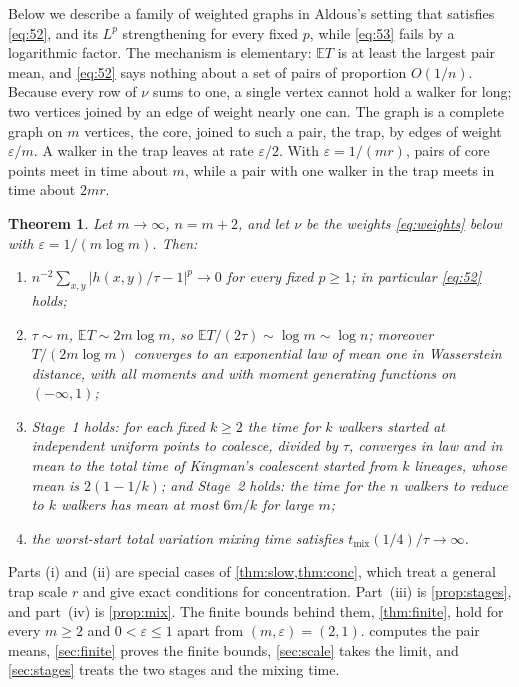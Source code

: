 \documentclass[11pt,a4paper]{article}
\numberwithin{equation}{section}
\newtheorem{theorem}{Theorem}[section]
\theoremstyle{remark}
\newcommand{\E}{\mathbb E}
\newcommand{\eps}{\varepsilon}
\newcommand{\abs}[1]{\lvert#1\rvert}
\begin{document}
Below we describe a family of weighted graphs in Aldous's setting that satisfies \eqref{eq:52}, and its $L^p$ strengthening for every fixed $p$, while \eqref{eq:53} fails by a logarithmic factor. The mechanism is elementary: $\E T$ is at least the largest pair mean, and \eqref{eq:52} says nothing about a set of pairs of proportion $O(1/n)$. Because every row of $\nu$ sums to one, a single vertex cannot hold a walker for long; two vertices joined by an edge of weight nearly one can. The graph is a complete graph on $m$ vertices, the core, joined to such a pair, the trap, by edges of weight $\eps/m$. A walker in the trap leaves at rate $\eps/2$. With $\eps=1/(mr)$, pairs of core points meet in time about $m$, while a pair with one walker in the trap meets in time about $2mr$.

\begin{theorem}\label{thm:main}
Let $m\to\infty$, $n=m+2$, and let $\nu$ be the weights \eqref{eq:weights} below with $\eps=1/(m\log m)$. Then:
\begin{enumerate}[label=\textup{(\roman*)}]
\item $n^{-2}\sum_{x,y}\abs{h(x,y)/\tau-1}^p\to0$ for every fixed $p\ge1$; in particular \eqref{eq:52} holds;
\item $\tau\sim m$, $\E T\sim2m\log m$, so $\E T/(2\tau)\sim\log m\sim\log n$; moreover $T/(2m\log m)$ converges to an exponential law of mean one in Wasserstein distance, with all moments and with moment generating functions on $(-\infty,1)$;
\item Stage~1 holds: for each fixed $k\ge2$ the time for $k$ walkers started at independent uniform points to coalesce, divided by $\tau$, converges in law and in mean to the total time of Kingman's coalescent started from $k$ lineages, whose mean is $2(1-1/k)$; and Stage~2 holds: the time for the $n$ walkers to reduce to $k$ walkers has mean at most $6m/k$ for large $m$;
\item the worst-start total variation mixing time satisfies $t_{\mathrm{mix}}(1/4)/\tau\to\infty$.
\end{enumerate}
\end{theorem}

Parts (i) and (ii) are special cases of \cref{thm:slow,thm:conc}, which treat a general trap scale $r$ and give exact conditions for concentration. Part~(iii) is \cref{prop:stages}, and part~(iv) is \cref{prop:mix}. The finite bounds behind them, \cref{thm:finite}, hold for every $m\ge2$ and $0<\eps\le1$ apart from $(m,\eps)=(2,1)$.  computes the pair means, \cref{sec:finite} proves the finite bounds, \cref{sec:scale} takes the limit, and \cref{sec:stages} treats the two stages and the mixing time.
\end{document}
